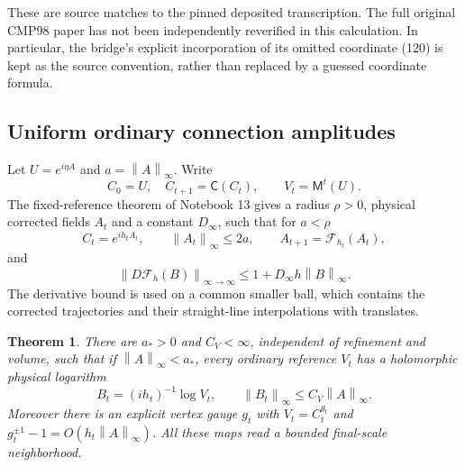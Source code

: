 \documentclass[11pt]{article}
\newtheorem{theorem}{Theorem}[section]
\theoremstyle{remark}
\newcommand{\norm}[1]{\left\|#1\right\|}
\begin{document}
These are source matches to the pinned deposited transcription.
The full original CMP98 paper has not been independently
reverified in this calculation. In particular, the bridge's
explicit incorporation of its omitted coordinate (120) is kept
as the source convention, rather than replaced by a guessed
coordinate formula.

\subsection{Uniform ordinary connection amplitudes}

Let $U=e^{i\eta A}$ and $a=\norm{A}_\infty$. Write
\begin{equation}\label{nb-two-trajectories}
 C_0=U,\quad C_{t+1}=\mathsf C(C_t),\qquad
 V_t=\mathsf M^t(U).
\end{equation}
The fixed-reference theorem of Notebook 13 gives a radius
$\rho>0$, physical corrected fields $A_t$ and a constant
$D_\infty$, such that for $a<\rho$
\begin{equation}\label{nb-corrected-input}
 C_t=e^{ih_tA_t},\qquad \norm{A_t}_\infty\le2a,
 \qquad A_{t+1}=\mathcal F_{h_t}(A_t),
\end{equation}
and
\begin{equation}\label{nb-one-step-derivative}
 \norm{D\mathcal F_h(B)}_{\infty\to\infty}
             \le1+D_\infty h\norm{B}_\infty.
\end{equation}
The derivative bound is used on a common smaller ball, which
contains the corrected trajectories and their straight-line
interpolations with translates.

\begin{theorem}\label{nb-trajectory-theorem}
There are $a_*>0$ and $C_V<\infty$, independent of refinement
and volume, such that if $\norm{A}_\infty<a_*$, every ordinary
reference $V_t$ has a holomorphic physical logarithm
\begin{equation}\label{nb-ordinary-amplitude}
 B_t=(ih_t)^{-1}\log V_t,\qquad
             \norm{B_t}_\infty\le C_V\norm{A}_\infty.
\end{equation}
Moreover there is an explicit vertex gauge $g_t$ with
$V_t=C_t^{g_t}$ and $g_t^{\pm1}-1=O(h_t\norm{A}_\infty)$.
All these maps read a bounded final-scale neighborhood.
\end{theorem}
\end{document}
